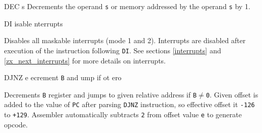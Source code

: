 \documentclass[12pt,twoside,openright,a4paper]{book}
\begin{document}
\begin{basedescript}{
	\desclabelstyle{\multilinelabel}
	\desclabelwidth{3cm}}
\begin{DetailItem}{DEC s}
		Decrements the operand {\tt s} or memory addressed by the operand {\tt s} by 1.

		\begin{DetailEffects}[v]
			\FlagsDECr[8-bit]
		\end{DetailEffects}
		
		\begin{DetailTiming}
		\end{DetailTiming}

	\end{DetailItem}

	\pagebreak
	\begin{DetailItem}{DI}
		{isable nterrupts}
		{\SymDI}

		Disables all maskable interrupts (mode 1 and 2). Interrupts are disabled after execution of the instruction following {\tt DI}. See sections \ref{interrupts} and \ref{zx_next_interrupts} for more details on interrupts.
		
		\begin{DetailEffects}
			\FlagsDI
		\end{DetailEffects}
				
		\begin{DetailTiming}
			\DetailTime{1}{4}
		\end{DetailTiming}

	\end{DetailItem}

	\begin{DetailItem}{DJNZ e}
		{ecrement {\tt B} and ump if ot \IH{Z}ero}
		{\SymDJNZ{e}}

		Decrements {\tt B} register and jumps to given relative address if {\tt B$\neq$0}. Given offset is added to the value of {\tt PC} after parsing {\tt DJNZ} instruction, so effective offset it {\tt -126} to {\tt +129}. Assembler automatically subtracts {\tt 2} from offset value {\tt e} to generate opcode.

		\begin{DetailEffects}
			\FlagsDJNZ
		\end{DetailEffects}
				
		\begin{DetailTiming}
			\DetailTimeRegular[{\tt B}=0]{2}{8}
			\DetailTimeRegular[{\tt B}$\neq$0]{3}{13}
		\end{DetailTiming}


\end{DetailItem}
\end{basedescript}
\end{document}
